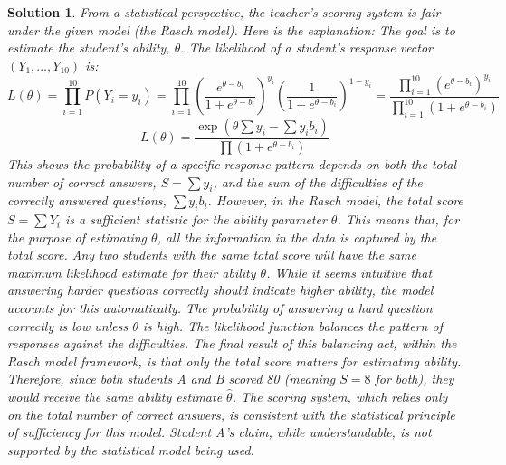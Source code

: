 \documentclass[12pt]{amsart}
\newtheorem*{solution}{Solution}
\begin{document}
\begin{solution}
From a statistical perspective, the teacher's scoring system is fair under the given model (the Rasch model). Here is the explanation:
The goal is to estimate the student's ability, $\theta$. The likelihood of a student's response vector $(Y_1, \ldots, Y_{10})$ is:
$$ L(\theta) = \prod_{i=1}^{10} P(Y_i=y_i) = \prod_{i=1}^{10} \left(\frac{e^{\theta-b_i}}{1+e^{\theta-b_i}}\right)^{y_i} \left(\frac{1}{1+e^{\theta-b_i}}\right)^{1-y_i} = \frac{\prod_{i=1}^{10} (e^{\theta-b_i})^{y_i}}{\prod_{i=1}^{10} (1+e^{\theta-b_i})} $$
$$ L(\theta) = \frac{\exp(\theta \sum y_i - \sum y_i b_i)}{\prod (1+e^{\theta-b_i})} $$
This shows the probability of a specific response pattern depends on both the total number of correct answers, $S = \sum y_i$, and the sum of the difficulties of the correctly answered questions, $\sum y_i b_i$.
However, in the Rasch model, the total score $S = \sum Y_i$ is a sufficient statistic for the ability parameter $\theta$. This means that, for the purpose of estimating $\theta$, all the information in the data is captured by the total score. Any two students with the same total score will have the same maximum likelihood estimate for their ability $\theta$.
While it seems intuitive that answering harder questions correctly should indicate higher ability, the model accounts for this automatically. The probability of answering a hard question correctly is low unless $\theta$ is high. The likelihood function balances the pattern of responses against the difficulties. The final result of this balancing act, within the Rasch model framework, is that only the total score matters for estimating ability.
Therefore, since both students A and B scored 80 (meaning $S=8$ for both), they would receive the same ability estimate $\hat{\theta}$. The scoring system, which relies only on the total number of correct answers, is consistent with the statistical principle of sufficiency for this model. Student A's claim, while understandable, is not supported by the statistical model being used.
\end{solution}
\end{document}
